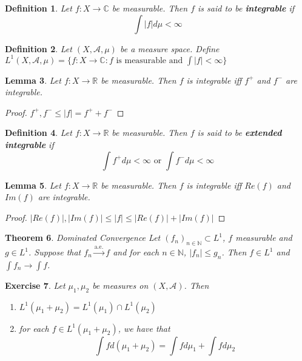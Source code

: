 \documentclass[12pt]{amsart}
\newtheorem{thm}{Theorem}[section]
\newtheorem{lem}[thm]{Lemma}
\newtheorem{defn}[thm]{Definition}
\newtheorem{ex}[thm]{Exercise}
\newcommand{\C}{\mathbb{C}}
\newcommand{\N}{\mathbb{N}}
\newcommand{\R}{\mathbb{R}}
\newcommand{\MA}{\mathcal{A}}
\begin{document}
\begin{defn}
Let $f:X \rightarrow \C$ be measurable. Then $f$ is said to be \textbf{integrable} if $$\int |f| d\mu < \infty$$
\end{defn}

\begin{defn}
Let $(X, \MA, \mu)$ be a measure space. Define $L^1(X, \MA, \mu) = \{f:X \rightarrow \C : f \text{ is measurable and } \int |f| < \infty \}$
\end{defn}

\begin{lem}
Let $f:X \rightarrow \R$ be measurable. Then $f$ is integrable iff $f^+$ and $f^-$ are integrable. 
\end{lem}

\begin{proof}
$f^+,f^- \leq |f| = f^+ + f^-$
\end{proof}

\begin{defn}
Let $f:X \rightarrow \R$ be measurable. Then $f$ is said to be \textbf{extended integrable} if $$\int f^+ d\mu  < \infty \text{ or } \int f^- d\mu < \infty$$
\end{defn}

\begin{lem}
Let $f:X \rightarrow \R$ be measurable. Then $f$ is integrable iff $Re(f)$ and $Im(f)$ are integrable.
\end{lem}

\begin{proof}
$|Re(f)|, |Im(f)| \leq |f| \leq |Re(f)| + |Im(f)|$
\end{proof}

\begin{thm}{Dominated Convergence}
Let $(f_n)_{n \in \N} \subset L^1$, $f$ measurable and $g \in L^1$. Suppose that $f_n \xrightarrow{\text{a.e.}} f$ and for each $n \in \N$, $|f_n| \leq g_n$. Then $f \in L^1$ and $\int f_n \rightarrow \int f$. 
\end{thm}

\begin{ex}
Let $\mu_1, \mu_2$ be measures on $(X, \MA)$. Then
\begin{enumerate}
\item $L^1(\mu_1 + \mu_2) = L^1(\mu_1) \cap L^1(\mu_2)$

\item for each $f \in L^1(\mu_1 + \mu_2)$, we have that $$\int f d(\mu_1 + \mu_2) = \int f d \mu_1 + \int f d\mu_2$$
\end{enumerate}

\end{ex}
\end{document}
